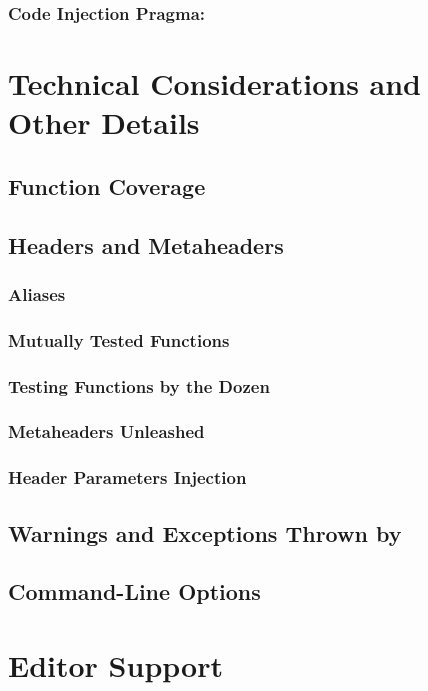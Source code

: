 \documentclass[a4paper,12pt]{article}
\begin{document}
    \subsubsection{Code Injection Pragma: }

\section{Technical Considerations and Other Details}
  \subsection{Function Coverage}
  \subsection{Headers and Metaheaders}
    \subsubsection{Aliases}
    \subsubsection{Mutually Tested Functions}
    \subsubsection{Testing Functions by the Dozen}
    \subsubsection{Metaheaders Unleashed}
    \subsubsection{Header Parameters Injection}\label{sec:param}
  \subsection{Warnings and Exceptions Thrown by \qtest{}}
  \subsection{\qtest{} Command-Line Options}

\section{Editor Support}
\end{document}
